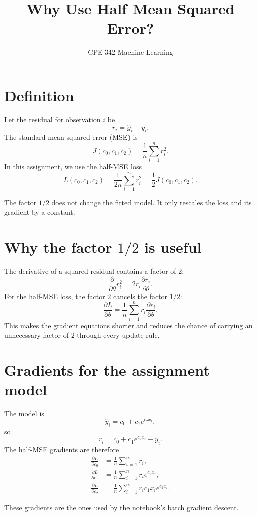 \documentclass[11pt]{article}
\title{Why Use Half Mean Squared Error?}
\author{CPE 342 Machine Learning}
\date{}
\begin{document}
\maketitle

\section{Definition}

Let the residual for observation $i$ be
\[
r_i = \hat{y}_i - y_i.
\]
The standard mean squared error (MSE) is
\[
J(c_0,c_1,c_2) = \frac{1}{n}\sum_{i=1}^{n} r_i^2.
\]
In this assignment, we use the half-MSE loss
\[
L(c_0,c_1,c_2) = \frac{1}{2n}\sum_{i=1}^{n} r_i^2
                 = \frac{1}{2}J(c_0,c_1,c_2).
\]

The factor $1/2$ does not change the fitted model. It only rescales the loss
and its gradient by a constant.

\section{Why the factor $1/2$ is useful}

The derivative of a squared residual contains a factor of $2$:
\[
\frac{\partial}{\partial \theta}r_i^2
= 2r_i\frac{\partial r_i}{\partial \theta}.
\]
For the half-MSE loss, the factor $2$ cancels the factor $1/2$:
\[
\frac{\partial L}{\partial \theta}
= \frac{1}{n}\sum_{i=1}^{n}
r_i\frac{\partial r_i}{\partial \theta}.
\]
This makes the gradient equations shorter and reduces the chance of carrying
an unnecessary factor of $2$ through every update rule.

\section{Gradients for the assignment model}

The model is
\[
\hat{y}_i = c_0 + c_1 e^{c_2x_i},
\]
so
\[
r_i = c_0 + c_1 e^{c_2x_i} - y_i.
\]
The half-MSE gradients are therefore
\begin{align*}
\frac{\partial L}{\partial c_0}
&= \frac{1}{n}\sum_{i=1}^{n}r_i, \\
\frac{\partial L}{\partial c_1}
&= \frac{1}{n}\sum_{i=1}^{n}r_i e^{c_2x_i}, \\
\frac{\partial L}{\partial c_2}
&= \frac{1}{n}\sum_{i=1}^{n}r_i c_1x_i e^{c_2x_i}.
\end{align*}

These gradients are the ones used by the notebook's batch gradient descent.
\end{document}
